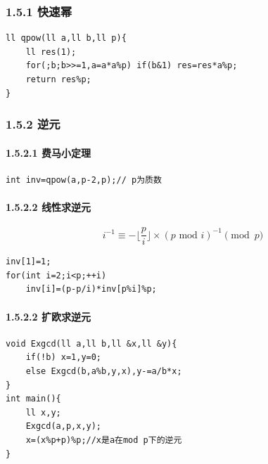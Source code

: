 \documentclass[UTF8,a4paper,11pt]{ctexart}
\begin{document}
\subsubsection*{1.5.1 快速幂}

\begin{Verbatim}[fontsize=\small,frame=single,breaklines=true,breakanywhere=true]
ll qpow(ll a,ll b,ll p){
    ll res(1);
    for(;b;b>>=1,a=a*a%p) if(b&1) res=res*a%p;
    return res%p;
}
\end{Verbatim}

\subsubsection*{1.5.2 逆元}

\paragraph*{1.5.2.1 费马小定理}
\begin{Verbatim}[fontsize=\small,frame=single,breaklines=true,breakanywhere=true]
int inv=qpow(a,p-2,p);// p为质数
\end{Verbatim}
\paragraph*{1.5.2.2 线性求逆元}
\[
i^{-1}\equiv-\lfloor\frac{p}{i}\rfloor\times(p\text{ mod } i)^{-1} \pmod{p}
\]

\begin{Verbatim}[fontsize=\small,frame=single,breaklines=true,breakanywhere=true]
inv[1]=1;
for(int i=2;i<p;++i)
    inv[i]=(p-p/i)*inv[p%i]%p;
\end{Verbatim}

\paragraph*{1.5.2.2 扩欧求逆元}

\begin{Verbatim}[fontsize=\small,frame=single,breaklines=true,breakanywhere=true]
void Exgcd(ll a,ll b,ll &x,ll &y){
    if(!b) x=1,y=0;
    else Exgcd(b,a%b,y,x),y-=a/b*x;
}
int main(){
    ll x,y;
    Exgcd(a,p,x,y);
    x=(x%p+p)%p;//x是a在mod p下的逆元
}
\end{Verbatim}
\end{document}
